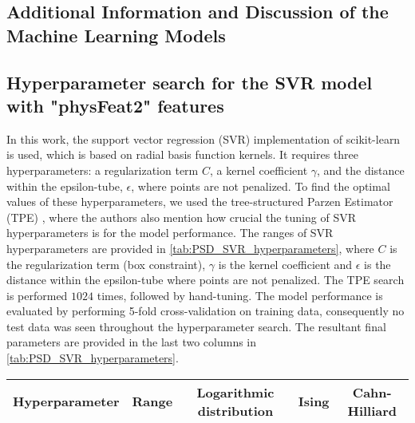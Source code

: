 \documentclass[11pt, authoryear]{elsarticle}
\begin{document}
\begin{appendix}
		\section{Additional Information and Discussion of the Machine Learning Models}                            
		\label{app:additional_model_info}
		
		
		
		\subsection{Hyperparameter search for the SVR model with "physFeat2" features}
		\label{appendix:SVRhyperparameter}
		In this work, the support vector regression (SVR) implementation of scikit-learn \cite{pedregosa2011scikit}
		is used, which is based on radial basis function kernels. It requires three 
		hyperparameters: a regularization term $C$, a kernel coefficient $\gamma$, and 
		the distance within the epsilon-tube, $\epsilon$, where points are not 
		penalized.  
		To find the optimal values of these hyperparameters, we used the tree-structured 
		Parzen Estimator (TPE) \cite{bergstra2011TPE}, where the authors also mention 
		how crucial the tuning of SVR hyperparameters is for the model performance. 
		The ranges of SVR hyperparameters are provided in 
		\cref{tab:PSD_SVR_hyperparameters}, where $C$ is the regularization term (box
		constraint), $\gamma$ is the kernel coefficient and $\epsilon$ is the distance 
		within the epsilon-tube where points are not penalized. The TPE search is
		performed $1024$ times, followed by hand-tuning. The model performance is
		evaluated by performing 5-fold cross-validation on training data, consequently 
		no test data was seen throughout the hyperparameter search. The resultant 
		final parameters are provided in the last two columns in
		\cref{tab:PSD_SVR_hyperparameters}. 
		\begin{table}
			\centering
			\renewcommand{\arraystretch}{1.3}
			\begin{tabular}{ c{30mm}|c{25mm}c{25mm}|c{20mm} c{20mm}  }
				\hline\hline
				\textbf{Hyperparameter} & \textbf{Range} & \textbf{Logarithmic distribution} & \textbf{Ising}  & \textbf{Cahn-Hilliard} \\\hline

\end{tabular}
\end{table}
\end{appendix}
\end{document}
